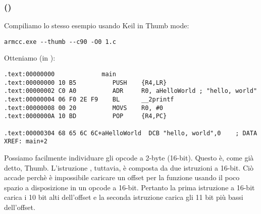 \subsubsection{\NonOptimizingKeilVI (\ThumbMode)}

Compiliamo lo stesso esempio usando Keil in Thumb mode:

\begin{lstlisting}
armcc.exe --thumb --c90 -O0 1.c
\end{lstlisting}

Otteniamo (in \IDA):

\begin{lstlisting}[caption=\NonOptimizingKeilVI (\ThumbMode) + \IDA,style=customasmARM]
.text:00000000             main
.text:00000000 10 B5          PUSH    {R4,LR}
.text:00000002 C0 A0          ADR     R0, aHelloWorld ; "hello, world"
.text:00000004 06 F0 2E F9    BL      __2printf
.text:00000008 00 20          MOVS    R0, #0
.text:0000000A 10 BD          POP     {R4,PC}

.text:00000304 68 65 6C 6C+aHelloWorld  DCB "hello, world",0    ; DATA XREF: main+2
\end{lstlisting}

Possiamo facilmente individuare gli opcode a 2-byte (16-bit). Questo è, come già detto, Thumb.
L'istruzione  , tuttavia, è composta da due istruzioni a 16-bit.
Ciò accade perchè è impossibile caricare un offset per la funzione \printf usando il poco spazio a disposizione in un opcode a 16-bit.
Pertanto la prima istruzione a 16-bit carica i 10 bit alti dell'offset e la seconda istruzione carica
gli 11 bit più bassi dell'offset.


